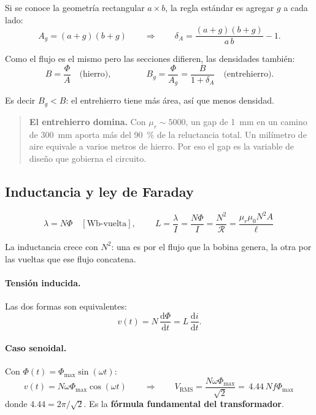 \documentclass[11pt,a4paper]{article}
\newcommand{\mur}{\mu_r}
\newcommand{\muz}{\mu_0}
\newcommand{\Rel}{\mathcal{R}}          %
\begin{document}
\noindent Si se conoce la geometría rectangular $a \times b$, la regla estándar es agregar
$g$ a cada lado:
\begin{equation}
  A_g = (a+g)(b+g)
  \qquad\Longrightarrow\qquad
  \delta_A = \frac{(a+g)(b+g)}{a\,b} - 1 .
\end{equation}

Como el flujo es el mismo pero las secciones difieren, las densidades también:
\begin{equation}
  B = \frac{\Phi}{A} \quad\text{(hierro)},
  \qquad\qquad
  B_g = \frac{\Phi}{A_g} = \frac{B}{1+\delta_A} \quad\text{(entrehierro)} .
\end{equation}

\noindent Es decir $B_g < B$: el entrehierro tiene más área, así que menos densidad.

\begin{quote}\small
\textbf{El entrehierro domina.} Con $\mur \sim 5000$, un gap de \qty{1}{\milli\metre} en un
camino de \qty{300}{\milli\metre} aporta más del \qty{90}{\percent} de la reluctancia total.
Un milímetro de aire equivale a varios metros de hierro. Por eso el gap es la variable de
diseño que gobierna el circuito.
\end{quote}

\subsection{Inductancia y ley de Faraday}

\begin{equation}
  \lambda = N\Phi \quad [\unit{\weber}\text{-vuelta}],
  \qquad
  \boxed{\ L = \frac{\lambda}{I} = \frac{N\Phi}{I} = \frac{N^2}{\Rel} = \frac{\mur\muz N^2 A}{\ell} \ }
\end{equation}

\noindent La inductancia crece con $N^2$: una es por el flujo que la bobina genera, la otra
por las vueltas que ese flujo concatena.

\paragraph{Tensión inducida.} Las dos formas son equivalentes:
\begin{equation}
  v(t) = N\,\frac{\mathrm{d}\Phi}{\mathrm{d}t}
       = L\,\frac{\mathrm{d}i}{\mathrm{d}t} .
\end{equation}

\paragraph{Caso senoidal.} Con $\Phi(t) = \Phi_{\max}\sin(\omega t)$:
\begin{equation}
  v(t) = N\omega\Phi_{\max}\cos(\omega t)
  \qquad\Longrightarrow\qquad
  V_{\text{RMS}} = \frac{N\omega\Phi_{\max}}{\sqrt{2}}
                 = \boxed{\,4.44\,N f \Phi_{\max}\,}
\end{equation}
donde $4.44 = 2\pi/\sqrt{2}$. Es la \textbf{fórmula fundamental del transformador}.
\end{document}
